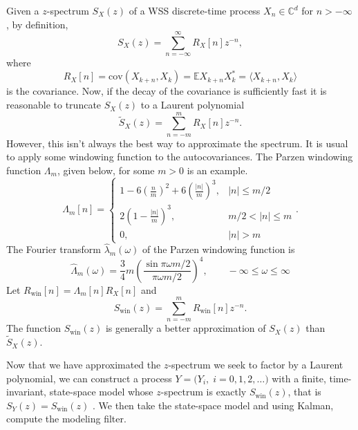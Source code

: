\documentclass[12pt]{amsart}
\newcommand{\E}{\mathbb{E}}
\newcommand{\C}{\mathbb{C}}
\newcommand{\cov}{\mathrm{cov}}
\begin{document}
Given a $z$-spectrum $S_X(z)$ of a WSS discrete-time process $X_n\in \C^d$ for $n>-\infty$, by definition, $$S_X(z) = \sum_{n=-\infty}^{\infty} R_X[n]z^{-n},$$
where $$R_X[n] = \cov(X_{k+n},X_{k}) = \E X_{k+n}X_{k}^* = \langle X_{k+n},X_{k}\rangle$$ is the covariance. Now, if the decay of the covariance is sufficiently fast it is reasonable to truncate $S_X(z)$ to a Laurent polynomial
$$\tilde{S}_X(z) = \sum_{n=-m}^{m} R_X[n]z^{-n}.$$
However, this isn't always the best way to approximate the spectrum. It is usual to apply some windowing function to the autocovariances. The Parzen windowing function $\Lambda_m$, given below, for some $m>0$ is an example. 
$$\Lambda_m[n] = \begin{cases}
1-6\left(\frac{n}{m}\right)^2+6\left(\frac{|n|}{m}\right)^3, & |n|\le m/2 \\
2\left(1-\frac{|n|}{m}\right)^3, & m/2 < |n| \le m \\
0, & |n| > m
\end{cases}.$$
The Fourier transform $\widehat{\lambda}_m(\omega)$ of the Parzen windowing function is 
$$\widehat{\Lambda}_m(\omega) = \frac{3}{4}m\left(\frac{\sin \pi \omega m/2}{\pi \omega m/2}\right)^4,\qquad -\infty \le \omega \le \infty$$
Let $R_\text{win}[n] = \Lambda_m[n]R_X[n]$ and 
$$S_\text{win}(z) = \sum_{n=-m}^{m} R_\text{win}[n]z^{-n}.$$
The function $S_\text{win}(z)$ is generally a better approximation of $S_{X}(z)$ than $\tilde{S}_{X}(z).$ 


Now that we have approximated the $z$-spectrum we seek to factor by a Laurent polynomial, we can construct a process $Y = \big(Y_i,\; i = 0,1,2, \dots)$ with a finite, time-invariant, state-space model whose $z$-spectrum is exactly $S_\text{win}(z)$, that is $S_{Y}(z) = S_\text{win}(z)$ \cite[p.~488]{sayed2001}. We then take the state-space model and using Kalman, compute the modeling filter. 
\end{document}
